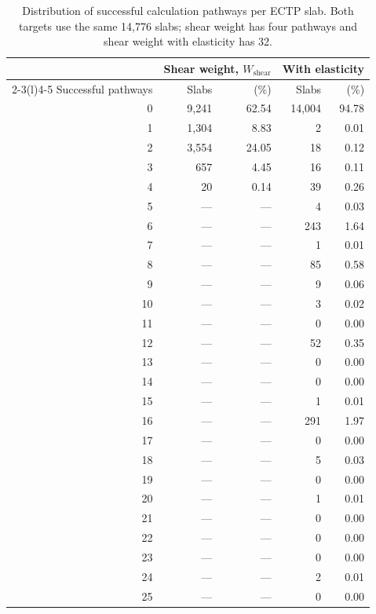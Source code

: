 \begin{table}[t]
\centering
\begin{threeparttable}
\caption{Distribution of successful calculation pathways per ECTP slab. Both targets use the same 14{,}776 slabs; shear weight has four pathways and shear weight with elasticity has 32.}
\label{tab:successful_pathway_distribution}
\small
\begin{tabular}{@{}rrrrr@{}}
\toprule
 & \multicolumn{2}{c}{Shear weight, $W_{\mathrm{shear}}$} & \multicolumn{2}{c}{With elasticity} \\
\cmidrule(lr){2-3}\cmidrule(l){4-5}
Successful pathways & Slabs & (\%) & Slabs & (\%) \\
\midrule
0 & 9{,}241 & 62.54 & 14{,}004 & 94.78 \\
1 & 1{,}304 & 8.83 & 2 & 0.01 \\
2 & 3{,}554 & 24.05 & 18 & 0.12 \\
3 & 657 & 4.45 & 16 & 0.11 \\
4 & 20 & 0.14 & 39 & 0.26 \\
5 & --- & --- & 4 & 0.03 \\
6 & --- & --- & 243 & 1.64 \\
7 & --- & --- & 1 & 0.01 \\
8 & --- & --- & 85 & 0.58 \\
9 & --- & --- & 9 & 0.06 \\
10 & --- & --- & 3 & 0.02 \\
11 & --- & --- & 0 & 0.00 \\
12 & --- & --- & 52 & 0.35 \\
13 & --- & --- & 0 & 0.00 \\
14 & --- & --- & 0 & 0.00 \\
15 & --- & --- & 1 & 0.01 \\
16 & --- & --- & 291 & 1.97 \\
17 & --- & --- & 0 & 0.00 \\
18 & --- & --- & 5 & 0.03 \\
19 & --- & --- & 0 & 0.00 \\
20 & --- & --- & 1 & 0.01 \\
21 & --- & --- & 0 & 0.00 \\
22 & --- & --- & 0 & 0.00 \\
23 & --- & --- & 0 & 0.00 \\
24 & --- & --- & 2 & 0.01 \\
25 & --- & --- & 0 & 0.00 \\

\end{tabular}
\end{threeparttable}
\end{table}
